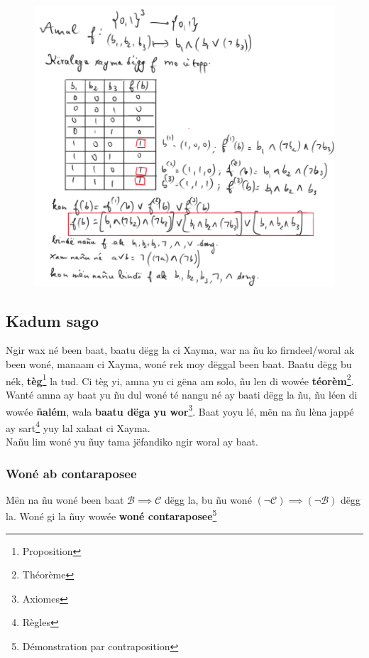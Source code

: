 \documentclass[twoside, a4paper]{article}
\begin{document}
\begin{figure}[ht]
  \centering
  \includegraphics[scale = 0.5]{image/informatik0.png}
  \label{fig:informatik0}
\end{figure}


\subsection{Kadum sago}
Ngir wax né been baat, baatu dëgg la ci Xayma, war na ñu ko firndeel/woral ak been woné, manaam ci Xayma, woné rek moy dëggal been baat. Baatu dëgg bu nék, \textbf{tèg}\footnote{Proposition} la tud. Ci tèg yi, amna yu ci gëna am solo, ñu len di wowée \textbf{téorèm}\footnote{Théorème}. Wanté amna ay baat yu ñu dul woné té nangu né ay baati dëgg la ñu, ñu léen di wowée \textbf{ñalém}, wala \textbf{baatu dëga yu wor}\footnote{Axiomes}. Baat yoyu lé, mën na ñu lèna jappé ay sart\footnote{Règles} yuy lal xalaat ci Xayma.\\


Nañu lim woné yu ñuy tama jëfandiko ngir woral ay baat.

\subsubsection{Woné ab contaraposee}
\begin{tcolorbox}[enhanced jigsaw,breakable,pad at break*=1mm, colback=red!5!white,colframe=white!75!black,title= Téeki,
    watermark color=white]
  Mën na ñu woné been baat $\mathcal{B} \implies \mathcal{C}$ dëgg la, bu ñu woné  $(\neg\mathcal{C}) \implies (\neg \mathcal{B})$ dëgg la. Woné gi la ñuy wowée \textbf{woné contaraposee}\footnote{Démonstration par contraposition}


\end{tcolorbox}
\end{document}
